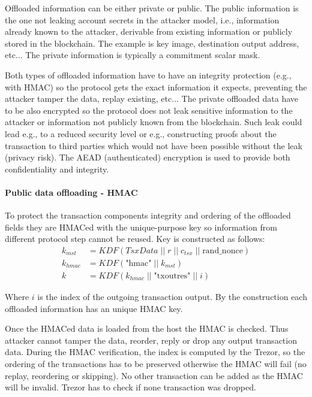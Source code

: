 \documentclass[]{article}
\begin{document}
Offloaded information can be either private or public. The public information is the one not leaking account secrets in the attacker model, i.e., information already known to the attacker, derivable from existing information or publicly stored in the blockchain. The example is key image, destination output address, etc... The private information is typically a commitment scalar mask.

Both types of offloaded information have to have an integrity protection (e.g., with HMAC) so the protocol gets the exact information it expects, preventing the attacker tamper the data, replay existing, etc...
The private offloaded data have to be also encrypted so the protocol does not leak sensitive information to the attacker or information not publicly known from the blockchain. Such leak could lead e.g., to a reduced security level or e.g., constructing proofs about the transaction to third parties which would not have been possible without the leak (privacy risk). The AEAD (authenticated) encryption is used to provide both confidentiality and integrity.


\paragraph{Public data offloading - HMAC}
To protect the transaction components integrity and ordering of the offloaded fields they are HMACed with the unique-purpose key so information from different protocol step cannot be reused. Key is constructed as follows:
\begin{equation}
\begin{split} \label{eq:det_mask}
k_{mst} &= \textit{KDF}(TsxData \; || \; r \; || \; c_{tsx} \; || \; \text{rand\_nonce})\\
k_{hmac} &= \textit{KDF}\left(\text{"hmac"} \; || \; k_{mst}\right)\\
k &= \textit{KDF}(k_{hmac} \; || \; \text{"txoutres"} \; || \; i)
\end{split}
\end{equation}

 Where $i$ is the index of the outgoing transaction output. By the construction each offloaded information has an unique HMAC key.

Once the HMACed data is loaded from the host the HMAC is checked. Thus attacker cannot tamper the data, reorder, reply or drop any output transaction data. During the HMAC verification, the index is computed by the Trezor, so the ordering of the transactions has to be preserved otherwise the HMAC will fail (no replay, reordering or skipping). No other transaction can be added as the HMAC will be invalid. Trezor has to check if none transaction was dropped.
\end{document}
